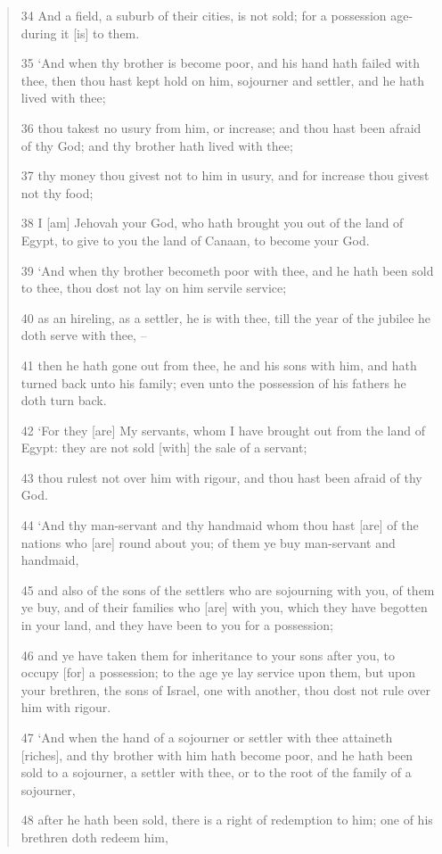 \documentclass[11pt]{article}
\begin{document}
{\begin{quote}
34 And a field, a suburb of their cities, is not sold; for a possession age-during it [is] to them.

35 `And when thy brother is become poor, and his hand hath failed with thee, then thou hast kept hold on him, sojourner and settler, and he hath lived with thee;

36 thou takest no usury from him, or increase; and thou hast been afraid of thy God; and thy brother hath lived with thee;

37 thy money thou givest not to him in usury, and for increase thou givest not thy food;

38 I [am] Jehovah your God, who hath brought you out of the land of Egypt, to give to you the land of Canaan, to become your God.

39 `And when thy brother becometh poor with thee, and he hath been sold to thee, thou dost not lay on him servile service;

40 as an hireling, as a settler, he is with thee, till the year of the jubilee he doth serve with thee, --

41 then he hath gone out from thee, he and his sons with him, and hath turned back unto his family; even unto the possession of his fathers he doth turn back.

42 `For they [are] My servants, whom I have brought out from the land of Egypt: they are not sold [with] the sale of a servant;

43 thou rulest not over him with rigour, and thou hast been afraid of thy God.

44 `And thy man-servant and thy handmaid whom thou hast [are] of the nations who [are] round about you; of them ye buy man-servant and handmaid,

45 and also of the sons of the settlers who are sojourning with you, of them ye buy, and of their families who [are] with you, which they have begotten in your land, and they have been to you for a possession;

46 and ye have taken them for inheritance to your sons after you, to occupy [for] a possession; to the age ye lay service upon them, but upon your brethren, the sons of Israel, one with another, thou dost not rule over him with rigour.

47 `And when the hand of a sojourner or settler with thee attaineth [riches], and thy brother with him hath become poor, and he hath been sold to a sojourner, a settler with thee, or to the root of the family of a sojourner,

48 after he hath been sold, there is a right of redemption to him; one of his brethren doth redeem him,


\end{quote}}
\end{document}
